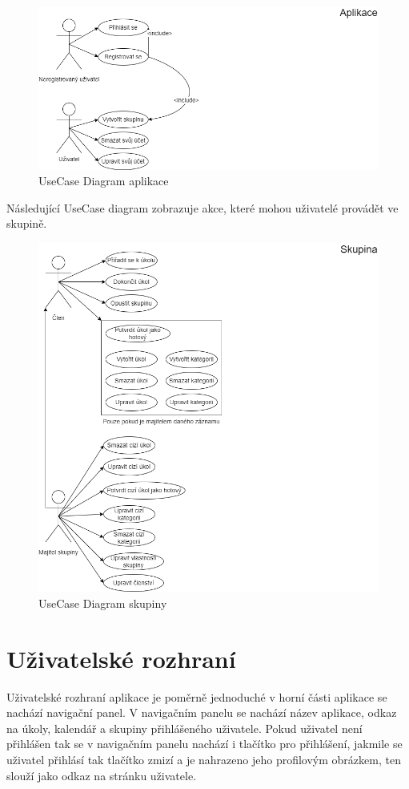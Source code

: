 \begin{figure}[hbt!]
	\includegraphics[width=0.8\linewidth]{img/UseCaseAplikace.png}
	\caption{UseCase Diagram aplikace}
\end{figure}

Následující UseCase diagram zobrazuje akce, které mohou uživatelé provádět ve skupině.
\begin{figure}[hbt!]
	\includegraphics[height=0.7\textwidth]{img/UseCaseSkupina.png}
	\caption{UseCase Diagram skupiny}
\end{figure}
\clearpage
\section{Uživatelské rozhraní}
Uživatelské rozhraní aplikace je poměrně jednoduché v horní části aplikace se nachází navigační panel. V navigačním panelu se nachází název aplikace, odkaz na úkoly, kalendář a skupiny přihlášeného uživatele. Pokud uživatel není přihlášen tak se v navigačním panelu nachází i tlačítko pro přihlášení, jakmile se uživatel přihlásí tak tlačítko zmizí a je nahrazeno jeho profilovým obrázkem, ten slouží jako odkaz na stránku uživatele. 


